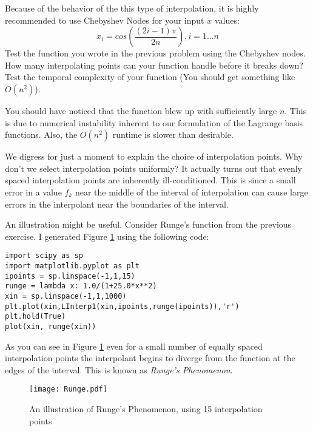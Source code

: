 \begin{problem}
Because of the behavior of the this type of interpolation, it is highly recommended to use Chebyshev Nodes for your input $x$ values:
\[
x_i = cos\left(\frac{(2i-1)\pi}{2n}\right), i = 1\ldots n
\]
Test the function you wrote in the previous problem using the Chebyshev nodes. How many interpolating points can your function handle before it breaks down? Test the temporal complexity of your function (You should get something like $O(n^2)$).
\end{problem}

You should have noticed that the function blew up with sufficiently large $n$. This is due to numerical instability inherent to our formulation of the Lagrange basis functions. Also, the $O(n^2)$ runtime is slower than desirable.

We digress for just a moment to explain the choice of interpolation points. Why don't we select interpolation points uniformly? It actually turns out that evenly spaced interpolation points are inherently ill-conditioned. This is since a small error in a value $f_k$ near the middle of the interval of interpolation can cause large errors in the interpolant near the boundaries of the interval.

An illustration might be useful. Consider Runge's function from the previous exercise. I generated Figure \ref{Fig:Runge} using the following code:

\begin{lstlisting}
import scipy as sp
import matplotlib.pyplot as plt
ipoints = sp.linspace(-1,1,15)
runge = lambda x: 1.0/(1+25.0*x**2)
xin = sp.linspace(-1,1,1000)
plt.plot(xin,LInterp1(xin,ipoints,runge(ipoints)),'r')
plt.hold(True)
plot(xin, runge(xin))
\end{lstlisting}

As you can see in Figure \ref{Fig:Runge} even for a small number of equally spaced interpolation points the interpolant begins to diverge from the function at the edges of the interval. This is known as \emph{Runge's Phenomenon}.

\begin{figure}
\begin{center}
\texttt{[image: Runge.pdf]}
\caption{An illustration of Runge's Phenomenon, using 15 interpolation points}
\label{Fig:Runge}
\end{center}
\end{figure}


